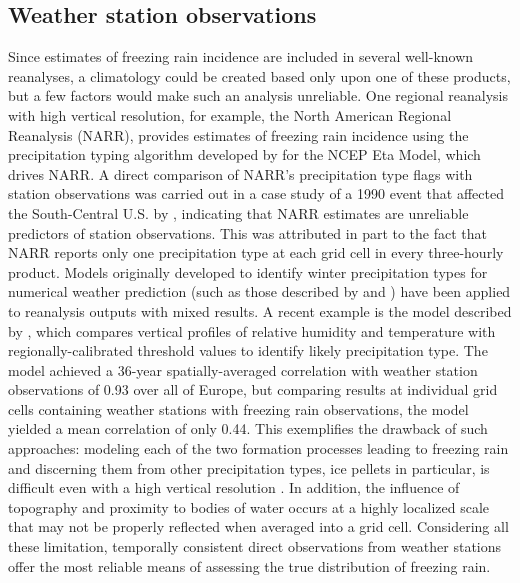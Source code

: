 \documentclass[twocol]{ametsoc}
\begin{document}
\subsection{Weather station observations}
Since estimates of freezing rain incidence are included in several well-known reanalyses, a climatology could be created based only upon one of these products, but a few factors would make such an analysis unreliable. One regional reanalysis with high vertical resolution, for example, the North American Regional Reanalysis (NARR), provides estimates of freezing rain incidence using the precipitation typing algorithm developed by \citet{baldwin1993development} for the NCEP Eta Model, which drives NARR. A direct comparison of NARR's precipitation type flags with station observations was carried out in a case study of a 1990 event that affected the South-Central U.S. by \citet{blunden2011138}, indicating that NARR estimates are unreliable predictors of station observations. This was attributed in part to the fact that NARR reports only one precipitation type at each grid cell in every three-hourly product. Models originally developed to identify winter precipitation types for numerical weather prediction (such as those described by \citet{cortinas2002probabilistic} and \citet{mullens2017multialgorithm}) have been applied to reanalysis outputs with mixed results. A recent example is the model described by \citet{kamarainen2017method}, which compares vertical profiles of relative humidity and temperature with regionally-calibrated threshold values to identify likely precipitation type. The model achieved a 36-year spatially-averaged correlation with weather station observations of 0.93 over all of Europe, but comparing results at individual grid cells containing weather stations with freezing rain observations, the model yielded a mean correlation of only 0.44. This exemplifies the drawback of such approaches: modeling each of the two formation processes leading to freezing rain and discerning them from other precipitation types, ice pellets in particular, is difficult even with a high vertical resolution \citep{reeves2014sources}. In addition, the influence of topography and proximity to bodies of water occurs at a highly localized scale that may not be properly reflected when averaged into a grid cell. Considering all these limitation, temporally consistent direct observations from weather stations offer the most reliable means of assessing the true distribution of freezing rain.
\end{document}
